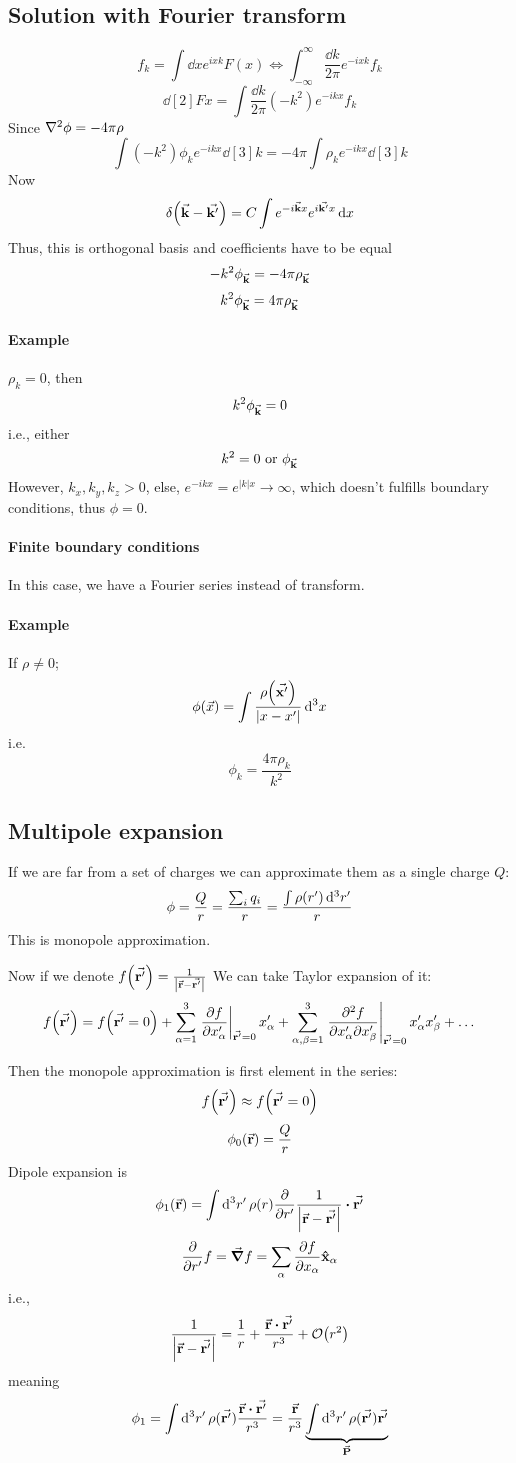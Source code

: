 \subsection{Solution with Fourier transform}
$$f_k = \int \dd{x} e^{ixk} F(x) \iff \int_{-\infty}^\infty \frac{\dd{k}}{2\pi} e^{-ixk} f_k $$
$$\dd[2]{F}{x} = \int  \frac{\dd{k}}{2\pi} (-k^2) e^{-ikx}  f_k$$
Since $\laplacian{\phi} = -4\pi \rho$
$$\int (-k^2) \phi_k e^{-ikx} \dd[3]{k} = -4\pi \int \rho_k e^{-ikx} \dd[3]{k}$$
Now
$$\delta\qty(\va{k} - \va{k'}) = C\int e^{-i \va{k} x} e^{i\va{k'} x} \dd{x}$$
Thus, this is orthogonal basis and coefficients have to be equal
$$-k^2 \phi_{\va{k}} = -4\pi \rho_{\va{k}}$$
$$k^2 \phi_{\va{k}} = 4\pi \rho_{\va{k}}$$
\paragraph{Example}
$\rho_k = 0$, then
$$k^2 \phi_{\va{k}} = 0$$
i.e., either $$k^2 =0 \text{ or } \phi_{\va{k}}$$
However, $k_x, k_y, k_z > 0$, else, $e^{-ikx} = e^{|k|x} \to \infty$, which doesn't fulfills boundary conditions, thus $\phi = 0$.
\paragraph{Finite boundary conditions}
In this case, we have a Fourier series instead of transform.
\paragraph{Example}
If $\rho \neq 0$;
$$\phi (\vec{x}) = \int \frac{\rho\qty(\va{x'})}{\qty|x-x'|} \dd[3]{x}$$
i.e.
$$\phi_k = \frac{4\pi \rho_k}{k^2}$$

\subsection{Multipole expansion}
If we are far from a set of charges we can approximate them as a single charge $Q$:
$$\phi = \frac{Q}{r} = \frac{\sum_i q_i}{r} = \frac{\int \rho\qty(r') \dd[3]{r'}}{r}$$
This is monopole approximation.

Now if we denote $f\qty(\va{r'}) = \frac{1}{\qty|\va{r} -\va{r'}|}$
We can take Taylor expansion of it:
$$f\qty(\va{r'}) = f\qty(\va{r'} = 0)  + \sum_{\alpha=1}^{3} \eval{\pdv{f}{x'_\alpha}}_{\va{r'} =0} x'_\alpha + \sum_{\alpha, \beta = 1}^{3} \eval{\pdv{f}{x'_\alpha}{x'_\beta}}_{\va{r'} =0} x'_\alpha x'_\beta+ \dots$$

Then the monopole approximation is first element in the series:
$$f\qty(\va{r'}) \approx f\qty(\va{r'} = 0)$$
$$\phi_0\qty(\va{r}) = \frac{Q}{r}$$
Dipole expansion is
$$\phi_1\qty(\va{r}) = \int \dd[3]{r'} \rho(r) \pdv{r'} \frac{1}{\qty|\va{r}-\va{r'}|} \vdot \va{r'} $$
$$\pdv{r'} f = \grad{f} = \sum_{\alpha}  \pdv{f}{x_\alpha} \vu{x}_\alpha$$
i.e.,
$$\frac{1}{\qty|\va{r}-\va{r'}|} = \frac{1}{r} + \frac{\va{r} \vdot \va{r'}}{r^3} + \order{r^2}$$
meaning
$$\phi_1 = \int \dd[3]{r'} \rho(\va{r'}) \frac{\va{r} \vdot \va{r'}}{r^3}  =  \frac{\va{r}}{r^3} \underbrace{ \int \dd[3]{r'} \rho(\va{r'}) \va{r'} }_{\va{P}}$$
